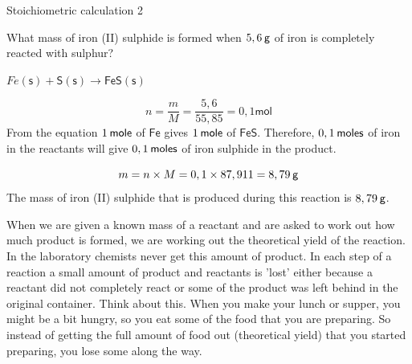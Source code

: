       \begin{wex}{Stoichiometric calculation 2 }
{
      \label{m38712*probfhsst!!!underscore!!!id1973}
      \label{m38712*id284347}What mass of iron (II) sulphide is formed when $5,6\phantom{\rule{2pt}{0ex}}\mathsf{g}$ of iron is completely reacted with sulphur?\par 
      \vspace{5pt} }
{
      \label{m38712*id284378}$Fe\left(\mathsf{s}\right)+\mathsf{S}\left(\mathsf{s}\right)\to \mathsf{FeS}\left(\mathsf{s}\right)$
      \par 
      \item  
      \label{m38712*id284430}\nopagebreak\noindent{}
        
    \begin{equation}
    n=\frac{m}{M}=\frac{5,6}{55,85}=0,1\mathsf{mol}
      \end{equation}
      \label{m38712*id284488}From the equation $1\phantom{\rule{2pt}{0ex}}\mathsf{mole}$ of $\mathsf{Fe}$ gives $1\phantom{\rule{2pt}{0ex}}\mathsf{mole}$ of $\mathsf{FeS}$. Therefore, $0,1\phantom{\rule{2pt}{0ex}}\mathsf{moles}$ of iron in the reactants will give $0,1\phantom{\rule{2pt}{0ex}}\mathsf{moles}$ of iron sulphide in the product.\par 
      \label{m38712*id284499}\nopagebreak\noindent{}
    \begin{equation}
    m=n\ensuremath{\times}M=0,1\ensuremath{\times}87,911=8,79\phantom{\rule{2pt}{0ex}}\mathsf{g}
      \end{equation}
      \label{m38712*id284548}The mass of iron (II) sulphide that is produced during this reaction is $8,79\phantom{\rule{2pt}{0ex}}\mathsf{g}$. \par 
}
    \end{wex}
    \noindent
\label{m38712*eip-943}When we are given a known mass of a reactant and are asked to work out how much product is formed, we are working out the theoretical yield of the reaction. In the laboratory chemists never get this amount of product. In each step of a reaction a small amount of product and reactants is 'lost' either because a reactant did not completely react or some of the product was left behind in the original container. Think about this. When you make your lunch or supper, you might be a bit hungry, so you eat some of the food that you are preparing. So instead of getting the full amount of food out (theoretical yield) that you started preparing, you lose some along the way. \par \label{m38712*secfhsst!!!underscore!!!id2067}\vspace{.5cm} 
